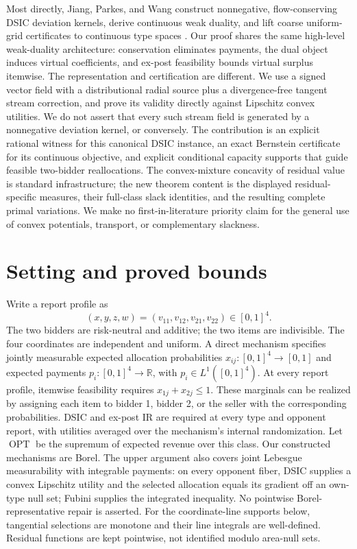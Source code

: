 \documentclass[11pt]{article}
\newcommand{\OPT}{\operatorname{OPT}}
\begin{document}
Most directly, Jiang, Parkes, and Wang construct nonnegative, flow-conserving
DSIC deviation kernels, derive continuous weak duality, and lift coarse
uniform-grid certificates to continuous type spaces
\citep{jiang2026duality}.  Our proof shares the same high-level weak-duality
architecture: conservation eliminates payments, the dual object induces
virtual coefficients, and ex-post feasibility bounds virtual surplus
itemwise.  The representation and certification are different.  We use a
signed vector field with a distributional radial source plus a
divergence-free tangent stream correction, and prove its validity directly
against Lipschitz convex utilities.  We do not assert that every such stream
field is generated by a nonnegative deviation kernel, or conversely.  The
contribution is an explicit rational witness for this canonical DSIC instance,
an exact Bernstein certificate for its continuous objective, and explicit
conditional capacity supports that guide feasible two-bidder reallocations.
The convex-mixture concavity of residual value is standard infrastructure;
the new theorem content is the displayed residual-specific measures, their
full-class slack identities, and the resulting complete primal variations.
We make no first-in-literature priority claim for the general use of convex
potentials, transport, or complementary slackness.

\section{Setting and proved bounds}

Write a report profile as
\[
 (x,y,z,w)=(v_{11},v_{12},v_{21},v_{22})\in[0,1]^4.
\]
The two bidders are risk-neutral and additive; the two items are indivisible.
The four coordinates are independent and uniform.  A direct mechanism
specifies jointly measurable expected allocation probabilities
\(x_{ij}:[0,1]^4\to[0,1]\) and expected payments
\(p_i:[0,1]^4\to\mathbb R\), with \(p_i\in L^1([0,1]^4)\).
At every report profile, itemwise feasibility requires
\(x_{1j}+x_{2j}\leq1\).  These marginals can be realized by assigning each
item to bidder 1, bidder 2, or the seller with the corresponding probabilities.
DSIC and ex-post IR are required at every type and opponent report, with
utilities averaged over the mechanism's internal randomization.  Let \(\OPT\)
be the supremum of expected revenue over this class.
Our constructed mechanisms are Borel. The upper argument also covers joint
Lebesgue measurability with integrable payments: on every opponent fiber,
DSIC supplies a convex Lipschitz utility and the selected allocation equals
its gradient off an own-type null set; Fubini supplies the integrated
inequality. No pointwise Borel-representative repair is asserted. For the
coordinate-line supports below, tangential selections are monotone and their
line integrals are well-defined. Residual functions are kept pointwise, not
identified modulo area-null sets.
\end{document}
